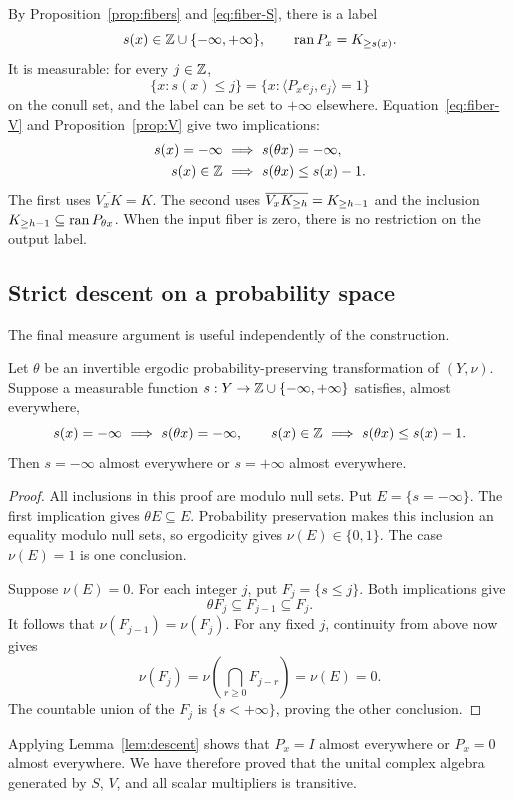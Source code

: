 By Proposition~\ref{prop:fibers} and \eqref{eq:fiber-S}, there is a label
\[
 s(x)\in\mathbb Z\cup\{-\infty,+\infty\},\qquad \operatorname{ran} P_x=K_{\ge s(x)}.
\]
It is measurable: for every $j\in\mathbb Z$,
\begin{equation}\label{eq:label-measurable}
 \{x:s(x)\le j\}=\{x:\langle P_xe_j,e_j\rangle=1\}
\end{equation}
on the conull set, and the label can be set to $+\infty$ elsewhere. Equation~\eqref{eq:fiber-V} and Proposition~\ref{prop:V} give two implications:
\begin{align}
 s(x)=-\infty&\ \Longrightarrow\ s(\theta x)=-\infty,\label{eq:full-descent}\\
 s(x)\in\mathbb Z&\ \Longrightarrow\ s(\theta x)\le s(x)-1.\label{eq:finite-descent}
\end{align}
The first uses $\overline{V_xK}=K$. The second uses $\overline{V_xK_{\ge h}}=K_{\ge h-1}$ and the inclusion $K_{\ge h-1}\subseteq\operatorname{ran} P_{\theta x}$. When the input fiber is zero, there is no restriction on the output label.

\subsection{Strict descent on a probability space}
The final measure argument is useful independently of the construction.
\begin{lemma}\label{lem:descent}
Let $\theta$ be an invertible ergodic probability-preserving transformation of $(Y,\nu)$. Suppose a measurable function $s:Y\to\mathbb Z\cup\{-\infty,+\infty\}$ satisfies, almost everywhere,
\[
 s(x)=-\infty\ \Longrightarrow\ s(\theta x)=-\infty,
 \qquad
 s(x)\in\Z\ \Longrightarrow\ s(\theta x)\le s(x)-1.
\]
Then $s=-\infty$ almost everywhere or $s=+\infty$ almost everywhere.
\end{lemma}
\begin{proof}
All inclusions in this proof are modulo null sets. Put $E=\{s=-\infty\}$. The first implication gives $\theta E\subseteq E$. Probability preservation makes this inclusion an equality modulo null sets, so ergodicity gives $\nu(E)\in\{0,1\}$. The case $\nu(E)=1$ is one conclusion.

Suppose $\nu(E)=0$. For each integer $j$, put $F_j=\{s\le j\}$. Both implications give
\[
 \theta F_j\subseteq F_{j-1}\subseteq F_j.
\]
It follows that $\nu(F_{j-1})=\nu(F_j)$. For any fixed $j$, continuity from above now gives
\[
 \nu(F_j)=\nu\left(\bigcap_{r\ge0}F_{j-r}\right)=\nu(E)=0.
\]
The countable union of the $F_j$ is $\{s<+\infty\}$, proving the other conclusion.
\end{proof}

Applying Lemma~\ref{lem:descent} shows that $P_x=I$ almost everywhere or $P_x=0$ almost everywhere. We have therefore proved that the unital complex algebra generated by $S$, $V$, and all scalar multipliers is transitive.
